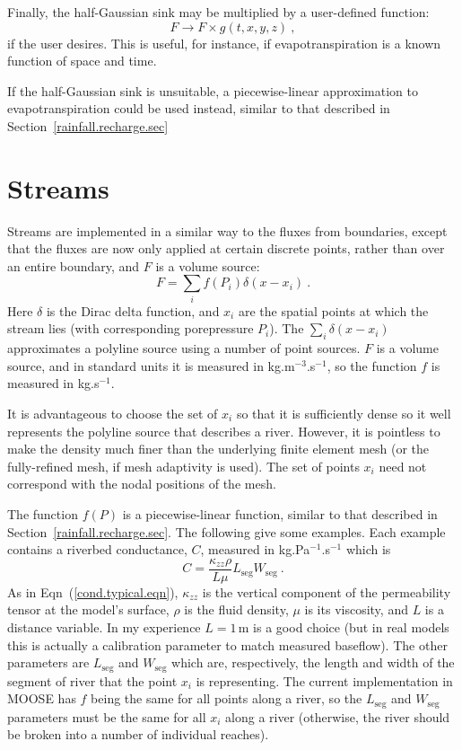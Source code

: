 \documentclass[]{scrreprt}
\begin{document}
Finally, the half-Gaussian sink may be multiplied by a
user-defined function: 
\begin{equation}
F \rightarrow F\times g(t, x, y, z) \ ,
\end{equation}
if the user desires.  This is useful, for instance, if
evapotranspiration is a known function of space and time. 


If the half-Gaussian sink is unsuitable, a piecewise-linear
approximation to evapotranspiration could be used instead, similar to
that described in Section~\ref{rainfall.recharge.sec}


\section{Streams}

Streams are implemented in a similar way to the fluxes from
boundaries, except that the fluxes are now only
applied at certain discrete points, rather than over an entire
boundary, and $F$ is a volume source:
\begin{equation}
F = \sum_{i}f(P_{i})\delta(x - x_{i}) \ .
\label{source.stream.eqn}
\end{equation}
Here $\delta$ is the Dirac delta function, and $x_{i}$ are the spatial
points at which the stream lies (with corresponding porepressure
$P_{i}$).  The $\sum_{i}\delta(x-x_{i})$ approximates a polyline source
using a number of point sources.  $F$ is a volume source, and in
standard units it is measured in kg.m$^{-3}$.s$^{-1}$, so the function
$f$ is measured in kg.s$^{-1}$.

It is advantageous to choose the set of $x_{i}$ so that it is
sufficiently dense so it well represents the polyline source that
describes a river.  However, it is pointless to make the density much
finer than the underlying finite element mesh (or the fully-refined
mesh, if mesh adaptivity is used).  The set of points $x_{i}$ need not
correspond with the nodal positions of the mesh.

The function $f(P)$ is a piecewise-linear function, similar to
that described in Section~\ref{rainfall.recharge.sec}.   The following
give some examples.   Each example contains a riverbed conductance,
$C$, measured in kg.Pa$^{-1}$.s$^{-1}$ which is
\begin{equation}
C = \frac{\kappa_{zz}\rho}{L\mu}L_{\mathrm{seg}}W_{\mathrm{seg}} \ .
\end{equation}
As in Eqn~(\ref{cond.typical.eqn}), $\kappa_{zz}$ is the vertical
component of the permeability tensor at the model's surface, $\rho$ is
the fluid density, $\mu$ is its viscosity, and $L$ is a distance
variable.  In my experience $L=1$\,m is a good choice (but in real
models this is actually a calibration parameter to match measured
baseflow).  The other parameters are $L_{\mathrm{seg}}$ and
$W_{\mathrm{seg}}$ which are, respectively, the length and width of
the segment of river that the point $x_{i}$ is representing.  The
current implementation in MOOSE has $f$ being the same for all
points along a river, so the $L_{\mathrm{seg}}$ and $W_{\mathrm{seg}}$
parameters must be the same for all $x_{i}$ along a river (otherwise,
the river should be broken into a number of individual reaches).
\end{document}
